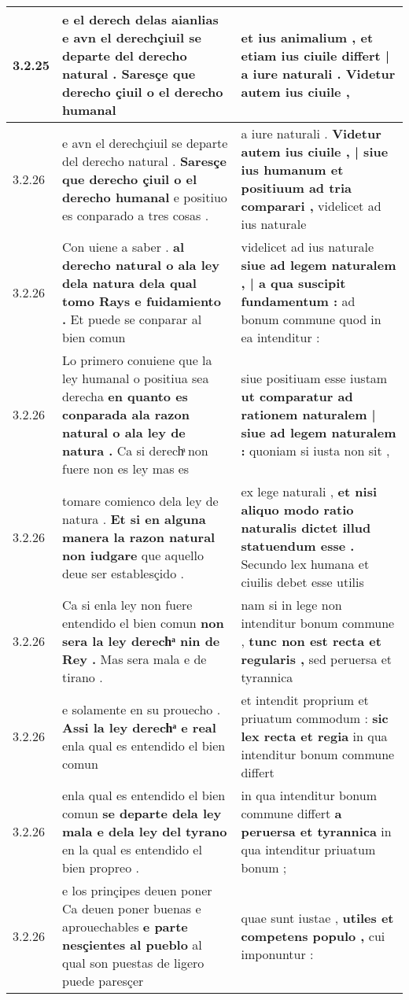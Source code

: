 \begin{tabular}{|p{1cm}|p{6.5cm}|p{6.5cm}|}
3.2.25 & e el derech delas aianlias \textbf{ e avn el derechçiuil se departe del derecho natural . } Saresçe que derecho çiuil o el derecho humanal & et ius animalium , \textbf{ et etiam ius ciuile differt | a iure naturali . } Videtur autem ius ciuile , \\\hline
3.2.26 & e avn el derechçiuil se departe del derecho natural . \textbf{ Saresçe que derecho çiuil o el derecho humanal } e positiuo es conparado a tres cosas . & a iure naturali . \textbf{ Videtur autem ius ciuile , | siue ius humanum et positiuum ad tria comparari , } videlicet ad ius naturale \\\hline
3.2.26 & Con uiene a saber . \textbf{ al derecho natural o ala ley dela natura dela qual tomo Rays e fuidamiento . } Et puede se conparar al bien comun & videlicet ad ius naturale \textbf{ siue ad legem naturalem , | a qua suscipit fundamentum : } ad bonum commune quod in ea intenditur : \\\hline
3.2.26 & Lo primero conuiene que la ley humanal o positiua sea derecha \textbf{ en quanto es conparada ala razon natural o ala ley de natura . } Ca si derechͣ non fuere non es ley mas es & siue positiuam esse iustam \textbf{ ut comparatur ad rationem naturalem | siue ad legem naturalem : } quoniam si iusta non sit , \\\hline
3.2.26 & tomare comienco dela ley de natura . \textbf{ Et si en alguna manera la razon natural non iudgare } que aquello deue ser establesçido . & ex lege naturali , \textbf{ et nisi aliquo modo ratio naturalis dictet illud statuendum esse . } Secundo lex humana et ciuilis debet esse utilis \\\hline
3.2.26 & Ca si enla ley non fuere entendido el bien comun \textbf{ non sera la ley derechͣ nin de Rey . } Mas sera mala e de tirano . & nam si in lege non intenditur bonum commune , \textbf{ tunc non est recta et regularis , } sed peruersa et tyrannica \\\hline
3.2.26 & e solamente en su prouecho . \textbf{ Assi la ley derechͣ e real } enla qual es entendido el bien comun & et intendit proprium et priuatum commodum : \textbf{ sic lex recta et regia } in qua intenditur bonum commune differt \\\hline
3.2.26 & enla qual es entendido el bien comun \textbf{ se departe dela ley mala e dela ley del tyrano } en la qual es entendido el bien propreo . & in qua intenditur bonum commune differt \textbf{ a peruersa et tyrannica } in qua intenditur priuatum bonum ; \\\hline
3.2.26 & e los prinçipes deuen poner Ca deuen poner buenas e aprouechables \textbf{ e parte nesçientes al pueblo } al qual son puestas de ligero puede paresçer & quae sunt iustae , \textbf{ utiles et competens populo , } cui imponuntur : \\\hline

\end{tabular}
